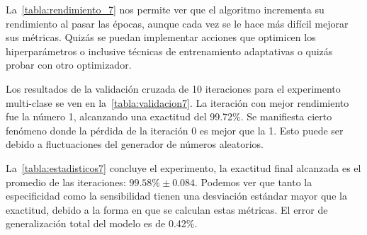 La~\autoref{tabla:rendimiento_7} nos permite ver que el algoritmo incrementa su
rendimiento al pasar las épocas, aunque cada vez se le hace más difícil mejorar
sus métricas. Quizás se puedan implementar acciones que optimicen los
hiperparámetros o inclusive técnicas de entrenamiento adaptativas o quizás
probar con otro optimizador.

Los resultados de la validación cruzada de 10 iteraciones para el experimento
multi-clase se ven en la~\autoref{tabla:validacion7}. La iteración con mejor
rendimiento fue la número 1, alcanzando una exactitud del 99.72\%. Se manifiesta
cierto fenómeno donde la pérdida de la iteración 0 es mejor que la 1. Esto puede
ser debido a fluctuaciones del generador de números aleatorios.

\begin{table}[H]
    \centering
    \caption{Resultados de la validación cruzada multi-clase}\label{tabla:validacion7}
    \end{table}

La~\autoref{tabla:estadisticos7} concluye el experimento, la exactitud final
alcanzada es el promedio de las iteraciones: \(99.58\% \pm 0.084\). Podemos ver
que tanto la especificidad como la sensibilidad tienen una desviación estándar
mayor que la exactitud, debido a la forma en que se calculan estas métricas. El
error de generalización total del modelo es de 0.42\%.

